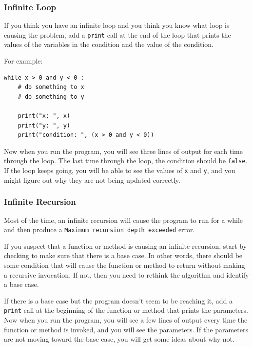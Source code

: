 \documentclass[10pt]{book}
\begin{document}
\subsubsection{Infinite Loop}

If you think you have an infinite loop and you think you know
what loop is causing the problem, add a {\tt print} call at
the end of the loop that prints the values of the variables in
the condition and the value of the condition.

For example:

\beforeverb
\begin{verbatim}
while x > 0 and y < 0 :
    # do something to x
    # do something to y

    print("x: ", x)
    print("y: ", y)
    print("condition: ", (x > 0 and y < 0))
\end{verbatim}
\afterverb
%
Now when you run the program, you will see three lines of output
for each time through the loop.  The last time through the
loop, the condition should be {\tt false}.  If the loop keeps
going, you will be able to see the values of {\tt x} and {\tt y},
and you might figure out why they are not being updated correctly.


\subsubsection{Infinite Recursion}

Most of the time, an infinite recursion will cause the program to run
for a while and then produce a {\tt Maximum recursion depth exceeded}
error.

If you suspect that a function or method is causing an infinite
recursion, start by checking to make sure that there is a base case.
In other words, there should be some condition that will cause the
function or method to return without making a recursive invocation.
If not, then you need to rethink the algorithm and identify a base
case.

If there is a base case but the program doesn't seem to be reaching
it, add a {\tt print} call at the beginning of the function or method
that prints the parameters.  Now when you run the program, you will see
a few lines of output every time the function or method is invoked,
and you will see the parameters.  If the parameters are not moving
toward the base case, you will get some ideas about why not.
\end{document}
